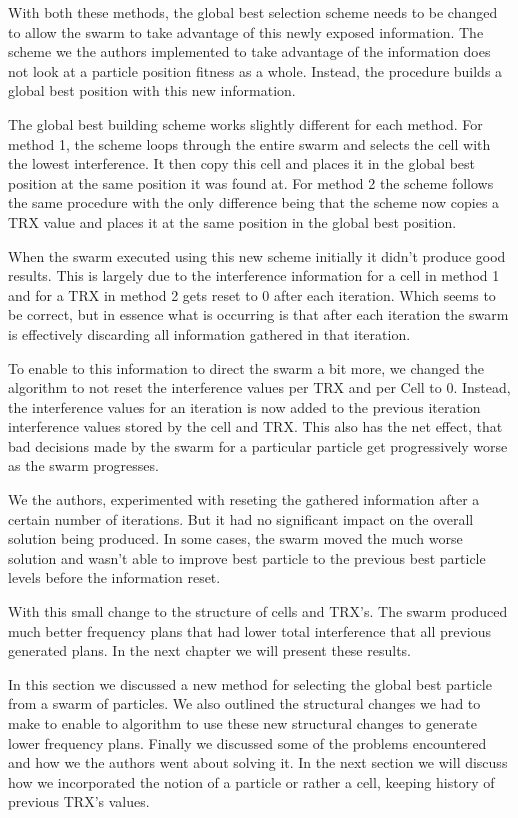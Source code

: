 With both these methods, the global best selection scheme needs to be changed to allow the swarm to take advantage of this newly exposed information. The scheme we the authors implemented to take advantage of the information does not look at a particle position fitness as a whole. Instead, the procedure builds a global best position with this new information. 

The global best building scheme works slightly different for each method. For method 1, the scheme loops through the entire swarm and selects the cell with the lowest interference. It then copy this cell and places it in the global best position at the same position it was found at. For method 2 the scheme follows the same procedure with the only difference being that the scheme now copies a TRX value and places it at the same position in the global best position.

When the swarm executed using this new scheme initially it didn't produce good results. This is largely due to the interference information for a cell in method 1 and for a TRX in method 2 gets reset to 0 after each iteration. Which seems to be correct, but 
in essence what is occurring is that after each iteration the swarm is effectively discarding all information gathered in that iteration. 

To enable to this information to direct the swarm a bit more, we changed the algorithm to not reset the interference values per TRX and per Cell to 0. Instead, the interference values for an iteration is now added to the previous iteration interference values stored by the cell and TRX. This also has the net effect, that bad decisions made by the swarm for a particular particle get progressively worse as the swarm progresses.

We the authors, experimented with reseting the gathered information after a certain number of iterations. But it had no significant impact on the overall solution being produced. In some cases, the swarm moved the much worse solution and wasn't able to improve best particle to the previous best particle levels before the information reset.

With this small change to the structure of cells and TRX's. The swarm produced much better frequency plans that had lower total interference that all previous generated plans. In the next chapter we will present these results.

In this section we discussed a new method for selecting the global best particle from a swarm of particles. We also outlined the structural changes we had to make to enable to algorithm to use these new structural changes to generate lower frequency plans. Finally we discussed some of the problems encountered and how we the authors went about solving it. In the next section we will discuss how we incorporated the notion of a particle or rather a cell, keeping history of previous TRX's values.

